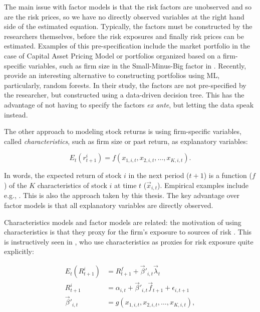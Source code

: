  	The main issue with factor models is that the risk factors are unobserved and so are the risk prices, so we have no directly observed variables at the right hand side of the estimated equation. Typically, the factors must be constructed by the researchers themselves, before the risk exposures and finally risk prices can be estimated. Examples of this pre-specification include the market portfolio in the case of Capital Asset Pricing Model or portfolios organized based on a firm-specific variables, such as firm size in the Small-Minus-Big factor in  \cite{fama1993common}. Recently, \cite{bryzgalova2019forest} provide an interesting alternative to constructing portfolios using ML, particularly, random forests. In their study, the factors are not pre-specified by the researcher, but constructed using a data-driven decision tree. This has the advantage of not having to specify the factors \textit{ex ante}, but letting the data speak instead. 
 	
 	The other approach to modeling stock returns is using firm-specific variables, called \textit{characteristics}, such as firm size or past return, as explanatory variables: 
 	
 	\begin{equation}
 		E_t(r^i_{t+1}) = f(x_{1,i,t}, x_{2,i,t}, \ldots, x_{K,i,t}).
 		\label{eq:expected_return}
 	\end{equation}
 
 	In words, the expected return of stock $i$ in the next period ($t+1$) is a function ($f$) of the $K$ characteristics of stock $i$ at time $t$ ($\vec{x}_{i,t}$). Empirical examples include e.g.,  \cite{gu2020empirical, tobek2020does, bryzgalova2019forest}. This is also the approach taken by this thesis. The key advantage over factor models is that all explanatory variables are directly observed.
 	
 	Characteristics models and factor models are related: the motivation of using characteristics is that they proxy for the firm's exposure to sources of risk \citep{bryzgalova2019forest, kelly2019characteristics}. This is instructively seen in \cite{kelly2019characteristics}, who use characteristics as proxies for risk exposure quite explicitly: 
 	
 	\begin{align*}
 		E_t(R^i_{t+1}) & = R^f_{t+1} + \vec{\beta}'_{i,t} \vec{\lambda}_{t} \\
 		R^i_{t+1} & = \alpha_{i,t} + \vec{\beta}'_{i,t} \vec{f}_{t+1} + \epsilon_{i,t+1} \\
 		\vec{\beta}'_{i,t} &= g(x_{1,i,t}, x_{2,i,t}, \ldots, x_{K,i,t}), 
 	\end{align*}
 	
